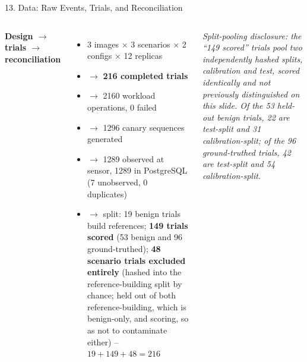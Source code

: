 \documentclass[aspectratio=169, 11pt]{beamer}
\begin{document}
\begin{frame}{13. Data: Raw Events, Trials, and Reconciliation}
\begin{columns}[T]
        \textbf{Design $\to$ trials $\to$ reconciliation}
        \begin{itemize}\setlength{\itemsep}{2pt}
            \item[] 3 images $\times$ 3 scenarios $\times$ 2 configs $\times$ 12 replicas
            \item[] $\to$ \textbf{216 completed trials}
            \item[] $\to$ 2160 workload operations, 0 failed
            \item[] $\to$ 1296 canary sequences generated
            \item[] $\to$ 1289 observed at sensor, 1289 in PostgreSQL (7 unobserved, 0 duplicates)
            \item[] $\to$ split: 19 benign trials build references; \textbf{149 trials scored} (53 benign and 96 ground-truthed); \textbf{48 scenario trials excluded entirely} (hashed into the reference-building split by chance; held out of both reference-building, which is benign-only, and scoring, so as not to contaminate either) -- $19+149+48=216$
        \end{itemize}
        \vspace{0.15cm}
        \scriptsize\textit{Split-pooling disclosure: the ``149 scored'' trials pool two
        independently hashed splits, calibration and test, scored identically and not
        previously distinguished on this slide. Of the 53 held-out benign trials, 22
        are test-split and 31 calibration-split; of the 96 ground-truthed trials, 42
        are test-split and 54 calibration-split.}
    \end{columns}
\end{frame}

\end{document}
